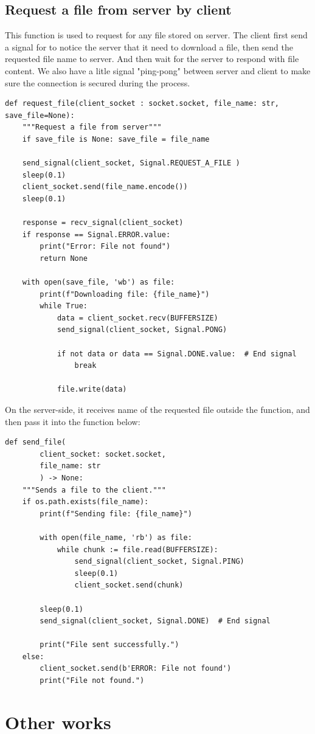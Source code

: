 \documentclass{article}
\begin{document}
\subsection*{Request a file from server by client}
This function is used to request for any file stored on server. The client first send a signal for to notice the server that it need to download a file, then
send the requested file name to server. And then wait for the server to respond with file content. We also have a litle signal "ping-pong" between server and client
to make sure the connection is secured during the process.\pagebreak
\begin{lstlisting}[frame=single]
  def request_file(client_socket : socket.socket, file_name: str, save_file=None):
    """Request a file from server"""
    if save_file is None: save_file = file_name

    send_signal(client_socket, Signal.REQUEST_A_FILE )
    sleep(0.1)
    client_socket.send(file_name.encode())
    sleep(0.1)

    response = recv_signal(client_socket)
    if response == Signal.ERROR.value:
        print("Error: File not found")
        return None
     
    with open(save_file, 'wb') as file:
        print(f"Downloading file: {file_name}")
        while True:
            data = client_socket.recv(BUFFERSIZE)
            send_signal(client_socket, Signal.PONG)

            if not data or data == Signal.DONE.value:  # End signal
                break

            file.write(data)
\end{lstlisting}
On the server-side, it receives name of the requested file outside the function, and then pass it into the function below:
\begin{lstlisting}[frame=single]
  def send_file(
        client_socket: socket.socket, 
        file_name: str
        ) -> None:
    """Sends a file to the client."""
    if os.path.exists(file_name):
        print(f"Sending file: {file_name}")

        with open(file_name, 'rb') as file:
            while chunk := file.read(BUFFERSIZE):
                send_signal(client_socket, Signal.PING)
                sleep(0.1)
                client_socket.send(chunk)

        sleep(0.1)
        send_signal(client_socket, Signal.DONE)  # End signal

        print("File sent successfully.")
    else:
        client_socket.send(b'ERROR: File not found')
        print("File not found.")
\end{lstlisting}
\section*{Other works}
\lipsum[4-4]
\end{document}
